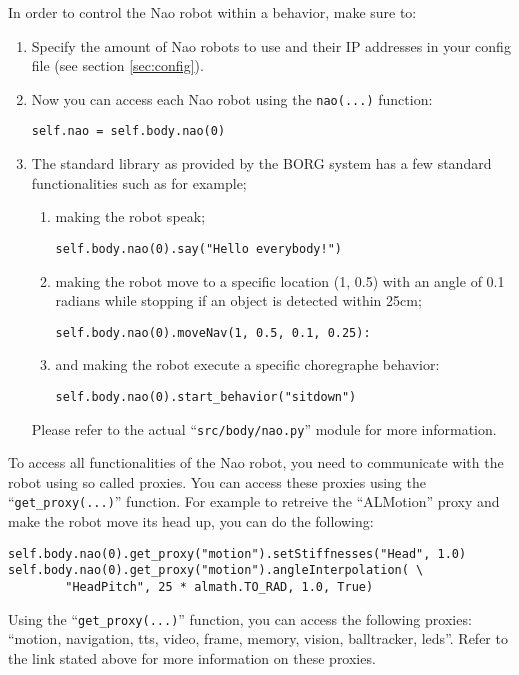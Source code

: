 \documentclass[a4paper, 10pt]{article}
\begin{document}
In order to control the Nao robot within a behavior, make sure to:
\begin{enumerate}
    \item Specify the amount of Nao robots to use and their IP addresses in your config file (see section \ref{sec:config}).
    \item Now you can access each Nao robot using the \lstinline{nao(...)} function:
\begin{lstlisting}
self.nao = self.body.nao(0)
\end{lstlisting}
    \item The standard library as provided by the BORG system has a few standard functionalities such as for example;
    \begin{enumerate}
        \item making the robot speak;
\begin{lstlisting}
self.body.nao(0).say("Hello everybody!")
\end{lstlisting}
        \item making the robot move to a specific location (1, 0.5) with an angle of 0.1 radians while stopping if an object is detected within 25cm;
\begin{lstlisting}
self.body.nao(0).moveNav(1, 0.5, 0.1, 0.25):
\end{lstlisting}
        \item and making the robot execute a specific choregraphe behavior:
\begin{lstlisting}
self.body.nao(0).start_behavior("sitdown")
\end{lstlisting}
    \end{enumerate}
    Please refer to the actual ``\lstinline{src/body/nao.py}'' module for more information.
\end{enumerate}

To access all functionalities of the Nao robot, you need to communicate with the robot using so called proxies.
You can access these proxies using the ``\lstinline{get_proxy(...)}'' function.
For example to retreive the ``ALMotion'' proxy and make the robot move its head up, you can do the following:
\begin{lstlisting}
self.body.nao(0).get_proxy("motion").setStiffnesses("Head", 1.0)
self.body.nao(0).get_proxy("motion").angleInterpolation( \
        "HeadPitch", 25 * almath.TO_RAD, 1.0, True)
\end{lstlisting}

Using the ``\lstinline{get_proxy(...)}'' function, you can access the following proxies: ``motion, navigation, tts, video, frame, memory, vision, balltracker, leds''.
Refer to the link stated above for more information on these proxies.
\end{document}
